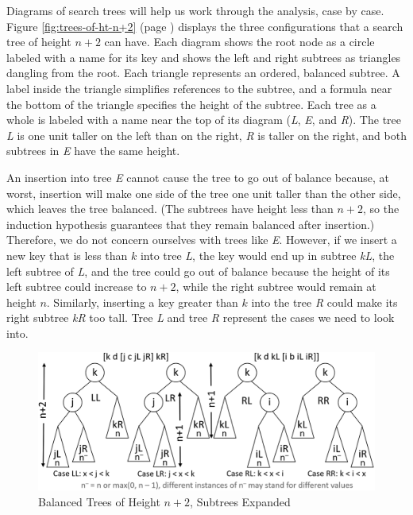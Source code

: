 Diagrams of search trees will help us work through the analysis, case by case.
Figure \ref{fig:trees-of-ht-n+2} (page \pageref{fig:trees-of-ht-n+2})
displays the three configurations that a search tree of height $n+2$ can have.
Each diagram shows the root node as a circle labeled with a name for its key
and shows the left and right subtrees as triangles dangling from the root.
Each triangle represents an ordered, balanced subtree.
A label inside the triangle
simplifies references to the subtree,
and a formula near the bottom of the triangle
specifies the height of the subtree.
Each tree as a whole is labeled with a name near the top of its diagram
(\emph{L}, \emph{E}, and \emph{R}).
The tree \emph{L} is one unit taller on the left than on the right,
\emph{R} is taller on the right, and
both subtrees in \emph{E} have the same height.

An insertion into tree \emph{E} cannot cause the tree to go out of balance
because, at worst, insertion will make one side of the tree
one unit taller than the other side, which leaves the tree
balanced. (The subtrees have height less than $n+2$,
so the induction hypothesis guarantees that they remain
balanced after insertion.)
Therefore, we do not concern ourselves with trees like \emph{E}.
However, if we insert a new key that is less than $k$
into tree \emph{L}, the key would end up in subtree \emph{kL},
the left subtree of \emph{L}, and
the tree could go out of balance
because the height of its left subtree could increase to $n+2$,
while the right subtree would remain at height $n$.
Similarly, inserting a key greater than $k$ into the tree \emph{R}
could make its right subtree \emph{kR} too tall.
Tree \emph{L} and tree \emph{R} represent the cases we need to look into.

\begin{figure}
\begin{center}
\includegraphics[scale=1]{images-cmyk/ht2-or-more-ex}
\end{center}
\caption{Balanced Trees of Height $n+2$, Subtrees Expanded}
\label{fig:trees-of-ht-n+2-expanded}
\end{figure}

